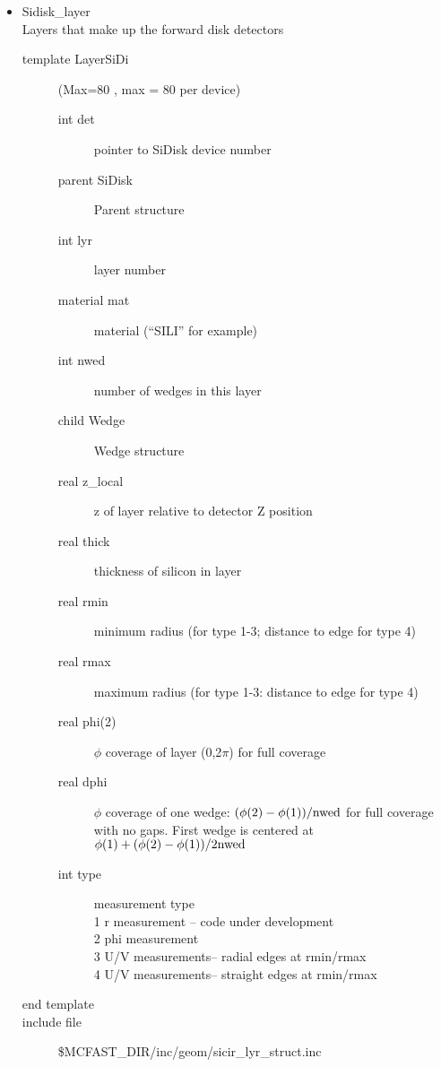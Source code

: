 \begin{itemize}
\item Sidisk\_layer  \\
Layers that make up the forward disk detectors
\begin{description}
\item[{\rm template} LayerSiDi](Max=80 , max = 80 per device)
\begin{description}
\item[{\rm  int} det]       pointer to SiDisk device number
\item[{\rm  parent} SiDisk] Parent structure
\item[{\rm  int} lyr]       layer number
\item[{\rm  material} mat]  material (``SILI'' for example)
\item[{\rm  int} nwed]      number of wedges in this layer
\item[{\rm  child} Wedge]   Wedge structure
\item[{\rm  real} z\_local]  z of layer relative to detector Z position
\item[{\rm  real} thick]    thickness of silicon in layer
\item[{\rm  real} rmin]     minimum radius (for type 1-3; distance to edge for type 4)
\item[{\rm  real} rmax]     maximum radius (for type 1-3: distance to edge for type 4)
\item[{\rm  real} phi(2)]   $\phi$ coverage of layer (0,2$\pi$) for full coverage
\item[{\rm  real} dphi]   $\phi$ coverage of one wedge: 
$(\phi(2)-\phi(1))/\rm nwed$ for full coverage
with no gaps.  First wedge is centered at $\phi(1) + (\phi(2)-\phi(1))/2\rm  nwed$
\item[{\rm  int} type]    measurement type  \\
                                 1 r measurement -- code under development \\
                                 2 phi measurement \\
                                 3 U/V measurements-- radial edges at rmin/rmax \\
                                 4 U/V measurements-- straight edges at rmin/rmax\\                                 
\end{description}
\item[end template]
\item[include file] \$MCFAST\_DIR/inc/geom/sicir\_lyr\_struct.inc 
\end{description}


\end{itemize}
